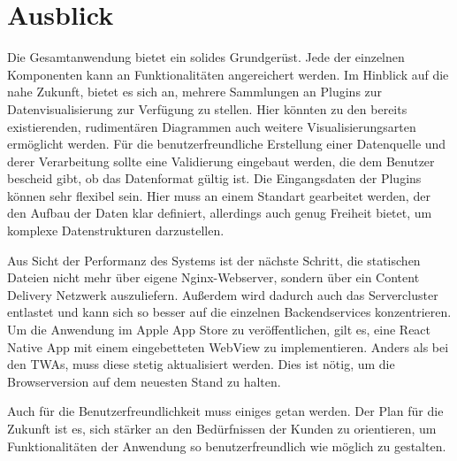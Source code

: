 \chapter{Ausblick}
\label{chap:ausblick}

Die Gesamtanwendung bietet ein solides Grundgerüst. Jede der einzelnen Komponenten
kann an Funktionalitäten angereichert werden. Im Hinblick auf die nahe Zukunft, bietet es sich an,
mehrere Sammlungen an Plugins zur Datenvisualisierung zur Verfügung zu stellen. Hier könnten
zu den bereits existierenden, rudimentären Diagrammen auch weitere Visualisierungsarten ermöglicht
werden. Für die benutzerfreundliche Erstellung einer Datenquelle und derer Verarbeitung
sollte eine Validierung eingebaut werden, die dem Benutzer bescheid gibt, ob das Datenformat
gültig ist. Die Eingangsdaten der Plugins können sehr flexibel sein. Hier muss an einem Standart
gearbeitet werden, der den Aufbau der Daten klar definiert, allerdings auch genug Freiheit bietet,
um komplexe Datenstrukturen darzustellen.

Aus Sicht der Performanz des Systems ist der nächste
Schritt, die statischen Dateien nicht mehr über eigene Nginx-Webserver, sondern über ein
Content Delivery Netzwerk auszuliefern. Außerdem wird dadurch auch das Servercluster
entlastet und kann sich so besser auf die einzelnen Backendservices konzentrieren.
Um die Anwendung im Apple App Store zu veröffentlichen, gilt es, eine React Native
App mit einem eingebetteten WebView zu implementieren. Anders als bei den TWAs, muss
diese stetig aktualisiert werden. Dies ist nötig, um die Browserversion auf
dem neuesten Stand zu halten. 

Auch für die Benutzerfreundlichkeit muss einiges getan werden. 
Der Plan für die Zukunft ist es, sich stärker an den Bedürfnissen der Kunden zu orientieren,
um Funktionalitäten der Anwendung so benutzerfreundlich wie möglich zu gestalten.

